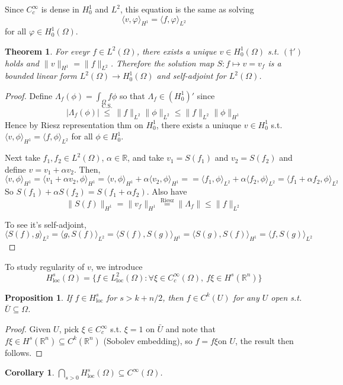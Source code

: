 \documentclass{article}
\theoremstyle{definition}
\theoremstyle{remark}
\theoremstyle{plain}
\newtheorem{thm}[defn]{Theorem}
\newtheorem{prop}[defn]{Proposition}
\newtheorem{crly}[defn]{Corollary}
\newcommand{\RR}{\mathbb{R}}
\begin{document}
Since $C_c^\infty$ is dense in $H_0^1$ and $L^2$, this equation is the same as solving 
\[\langle v,\varphi\rangle_{H^1}=\langle f,\varphi\rangle_{L^2}\tag{$\dagger'$}\]
 for all $\varphi\in H_0^1(\Omega)$.
 \begin{thm}
     For eveyr $f\in L^2(\Omega)$, there exists a unique $v\in H_0^1(\Omega)$ s.t. $(\dagger')$ holds and $\|v\|_{H^1}=\|f\|_{L^2}$. Therefore the solution map $S:f\mapsto v=v_f$ is a bounded linear form $L^2(\Omega)\to H_0^1(\Omega)$ and self-adjoint for $L^2(\Omega)$.
 \end{thm}
 \begin{proof}
     Define $\Lambda_f(\phi)=\int_\Omega f\phi$ so that $\Lambda_f\in(H_0^1)'$ since 
     \[|\Lambda_f(\phi)|\overset{\text{C.S.}}{\le}\|f\|_{L^2}\|\phi\|_{L^2}\le\|f\|_{L^2}\|\phi\|_{H^1}\]
     Hence by Riesz representation thm on $H_0^1$, there exists a uniuque $v\in H_0^1$ s.t. $\langle v,\phi\rangle_{H^1}=\langle f,\phi\rangle_{L^2}$ for all $\phi\in H_0^1$.

     Next take $f_1,f_2\in L^2(\Omega)$, $\alpha\in\RR$, and take $v_1=S(f_1)$ and $v_2=S(f_2)$ and define $v=v_1+\alpha v_2$. Then,
     \[\langle v,\phi\rangle_{H^1}=\langle v_1+\alpha v_2,\phi\rangle_{H^1}=\langle v,\phi\rangle_{H^1}+\alpha\langle v_2,\phi\rangle_{H^1}==\langle f_1,\phi\rangle_{L^2}+\alpha\langle f_2,\phi\rangle_{L^2}=\langle f_1+\alpha f_2,\phi\rangle_{L^2}\]
     So $S(f_1)+\alpha S(f_2)=S(f_1+\alpha f_2)$.
     Also have 
     \[\|S(f)\|_{H^1}=\|v_f\|_{H^1}\overset{\text{Riesz}}{=}\|\Lambda_f\|\le \|f\|_{L^2}\]

    To see it's self-adjoint,
     \[\langle S(f),g\rangle_{L^2}=\langle g, S(f)\rangle_{L^2}=\langle S(f),S(g)\rangle_{H^1}=\langle S(g),S(f)\rangle_{H^1}=\langle f,S(g)\rangle_{L^2}\]
 \end{proof}
 To study regularity of $v$, we introduce
 \[H_{\text{loc}}^s(\Omega)=\{f\in L^2_{\text{loc}}(\Omega):\forall \xi\in C_c^\infty(\Omega),\ f\xi\in H^s(\RR^n)\}\]
 \begin{prop}
     If $f\in H_{\text{loc}}^s$ for $s>k+n/2$, then $f\in C^k(U)$ for any $U$ open s.t. $\bar U\subseteq \Omega$.
 \end{prop}
 \begin{proof}
     Given $U$, pick $\xi\in C_c^\infty$ s.t. $\xi=1$ on $\bar U$ and note that $f\xi\in H^s(\RR^n)\subseteq C^k(\RR^n)$ (Sobolev embedding), so $f=f\xi $on $U$, the result then follows.
 \end{proof}
 \begin{crly}
     $\bigcap_{s>0} H^s_{\text{loc}}(\Omega)\subseteq C^\infty(\Omega)$.
 \end{crly}
\end{document}

